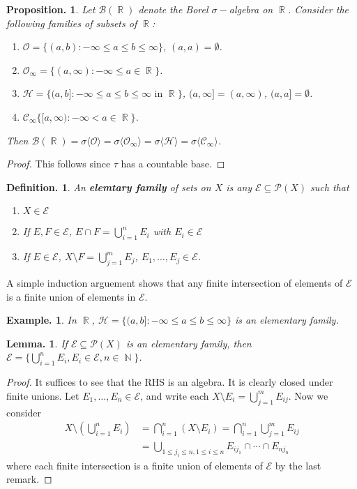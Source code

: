 \documentclass[11pt, a4paper]{memoir}
\DeclareMathOperator{\N}{{\mathbb{N}}}
\DeclareMathOperator{\R}{{\mathbb{R}}}
\theoremstyle{change}
\newtheorem{lemma}[theorem]{Lemma.}
\newtheorem{proposition}[theorem]{Proposition.}
\theoremstyle{plain}
\theoremstyle{nonumberplain}
\newtheorem{definition}{Definition.}
\newtheorem{example}{Example.}
\newtheorem{proof}{Proof}
\begin{document}
\begin{proposition}
    Let $\mathcal{B}(\R)$ denote the Borel $\sigma-$algebra on $\R$.
    Consider the following families of subsets of $\R$:
    \begin{enumerate}[nolistsep]
        \item $\mathcal{O}=\{(a,b):-\infty\leq a\leq b\leq\infty\}$, $(a,a)=\emptyset$.
        \item $\mathcal{O}_\infty=\{(a,\infty):-\infty\leq a\in\R\}$.
        \item $\mathcal{H}=\{(a,b]:-\infty\leq a\leq b\leq\infty\text{ in }\R\}$, $(a,\infty]=(a,\infty)$, $(a,a]=\emptyset$.
        \item $\mathcal{C}_\infty\{[a,\infty):-\infty<a\in\R\}$.
    \end{enumerate}
    Then $\mathcal{B}(\R)=\sigma\langle\mathcal{O}\rangle=\sigma\langle\mathcal{O}_\infty\rangle=\sigma\langle\mathcal{H}\rangle=\sigma\langle\mathcal{C}_\infty\rangle$.
\end{proposition}
\begin{proof}
    This follows since $\tau$ has a countable base.
\end{proof}
\begin{definition}
    An \textbf{elemtary family} of sets on $X$ is any $\mathcal{E}\subseteq\mathcal{P}(X)$ such that
    \begin{enumerate}[nolistsep,label=(\roman*)]
        \item $X\in\mathcal{E}$
        \item If $E,F\in\mathcal{E}$, $E\cap F=\bigcup_{i=1}^n E_i$ with $E_i\in\mathcal{E}$
        \item If $E\in\mathcal{E}$, $X\setminus F=\bigcup_{j=1}^m E_j$, $E_1,\ldots,E_j\in\mathcal{E}$.
    \end{enumerate}
\end{definition}
A simple induction arguement shows that any finite intersection of elements of $\mathcal{E}$ is a finite union of elements in $\mathcal{E}$.
\begin{example}
    In $\R$, $\mathcal{H}=\{(a,b]:-\infty\leq a\leq b\leq\infty\}$ is an elementary family. %
\end{example}
\begin{lemma}
    If $\mathcal{E}\subseteq\mathcal{P}(X)$ is an elementary family, then $\mathcal{E}=\{\bigcup_{i=1}^n E_i,E_i\in\mathcal{E},n\in\N\}$.
\end{lemma}
\begin{proof}
    It suffices to see that the RHS is an algebra.
    It is clearly closed under finite unions.
    Let $E_1,\ldots,E_n\in\mathcal{E}$, and write each $X\setminus E_i=\bigcup_{j=1}^m E_{ij}$.
    Now we consider
    \begin{align*}
        X\setminus\left(\bigcup_{i=1}^n E_i\right)&=\bigcap_{i=1}^n(X\setminus E_i)=\bigcap_{i=1}^n\bigcup_{j=1}^m E_{ij}\\
                                                  &=\bigcup_{1\leq j_i\leq n,1\leq i\leq n}E_{ij_1}\cap\cdots\cap E_{nj_n}
    \end{align*}
    where each finite intersection is a finite union of elements of $\mathcal{E}$ by the last remark.
\end{proof}
\end{document}
